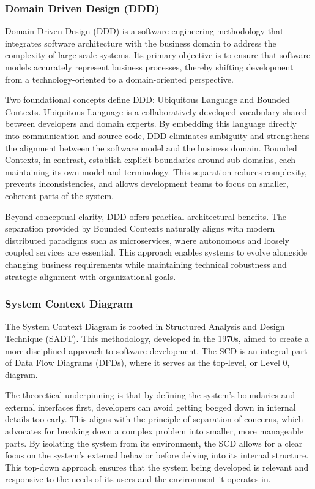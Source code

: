 \subsubsection{Domain Driven Design (DDD)}

Domain-Driven Design (DDD) is a software engineering methodology that integrates software architecture with the business domain to address the complexity of large-scale systems. Its primary objective is to ensure that software models accurately represent business processes, thereby shifting development from a technology-oriented to a domain-oriented perspective. \cite{ozkan2025ddd}

Two foundational concepts define DDD: Ubiquitous Language and Bounded Contexts. Ubiquitous Language is a collaboratively developed vocabulary shared between developers and domain experts. By embedding this language directly into communication and source code, DDD eliminates ambiguity and strengthens the alignment between the software model and the business domain. Bounded Contexts, in contrast, establish explicit boundaries around sub-domains, each maintaining its own model and terminology. This separation reduces complexity, prevents inconsistencies, and allows development teams to focus on smaller, coherent parts of the system.

Beyond conceptual clarity, DDD offers practical architectural benefits. The separation provided by Bounded Contexts naturally aligns with modern distributed paradigms such as microservices, where autonomous and loosely coupled services are essential. This approach enables systems to evolve alongside changing business requirements while maintaining technical robustness and strategic alignment with organizational goals. \cite{ozkan2025ddd}

\subsubsection{System Context Diagram}
\label{subsubsection:System Context Diagram}

The System Context Diagram is rooted in Structured Analysis and Design Technique (SADT). This methodology, developed in the 1970s, aimed to create a more disciplined approach to software development. The SCD is an integral part of Data Flow Diagrams (DFDs), where it serves as the top-level, or Level 0, diagram. \cite{paloalto2025dfd}

The theoretical underpinning is that by defining the system's boundaries and external interfaces first, developers can avoid getting bogged down in internal details too early. This aligns with the principle of separation of concerns, which advocates for breaking down a complex problem into smaller, more manageable parts. By isolating the system from its environment, the SCD allows for a clear focus on the system's external behavior before delving into its internal structure. This top-down approach ensures that the system being developed is relevant and responsive to the needs of its users and the environment it operates in.

